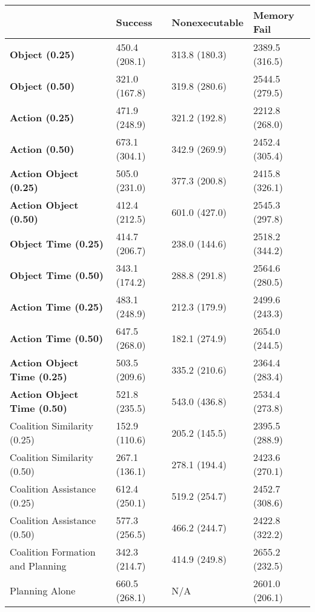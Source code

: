 \begin{tabular}{llll}
\hline
                                    & Success       & Nonexecutable   & Memory Fail    \\
\hline
 \textbf{Object (0.25)}             & 450.4 (208.1) & 313.8 (180.3)   & 2389.5 (316.5) \\
 \textbf{Object (0.50)}             & 321.0 (167.8) & 319.8 (280.6)   & 2544.5 (279.5) \\
 \textbf{Action (0.25)}             & 471.9 (248.9) & 321.2 (192.8)   & 2212.8 (268.0) \\
 \textbf{Action (0.50)}             & 673.1 (304.1) & 342.9 (269.9)   & 2452.4 (305.4) \\
 \textbf{Action Object (0.25)}      & 505.0 (231.0) & 377.3 (200.8)   & 2415.8 (326.1) \\
 \textbf{Action Object (0.50)}      & 412.4 (212.5) & 601.0 (427.0)   & 2545.3 (297.8) \\
 \textbf{Object Time (0.25)}        & 414.7 (206.7) & 238.0 (144.6)   & 2518.2 (344.2) \\
 \textbf{Object Time (0.50)}        & 343.1 (174.2) & 288.8 (291.8)   & 2564.6 (280.5) \\
 \textbf{Action Time (0.25)}        & 483.1 (248.9) & 212.3 (179.9)   & 2499.6 (243.3) \\
 \textbf{Action Time (0.50)}        & 647.5 (268.0) & 182.1 (274.9)   & 2654.0 (244.5) \\
 \textbf{Action Object Time (0.25)} & 503.5 (209.6) & 335.2 (210.6)   & 2364.4 (283.4) \\
 \textbf{Action Object Time (0.50)} & 521.8 (235.5) & 543.0 (436.8)   & 2534.4 (273.8) \\
 Coalition Similarity (0.25)        & 152.9 (110.6) & 205.2 (145.5)   & 2395.5 (288.9) \\
 Coalition Similarity (0.50)        & 267.1 (136.1) & 278.1 (194.4)   & 2423.6 (270.1) \\
 Coalition Assistance (0.25)        & 612.4 (250.1) & 519.2 (254.7)   & 2452.7 (308.6) \\
 Coalition Assistance (0.50)        & 577.3 (256.5) & 466.2 (244.7)   & 2422.8 (322.2) \\
 Coalition Formation and Planning   & 342.3 (214.7) & 414.9 (249.8)   & 2655.2 (232.5) \\
 Planning Alone                     & 660.5 (268.1) & N/A             & 2601.0 (206.1) \\
\hline
\end{tabular}
